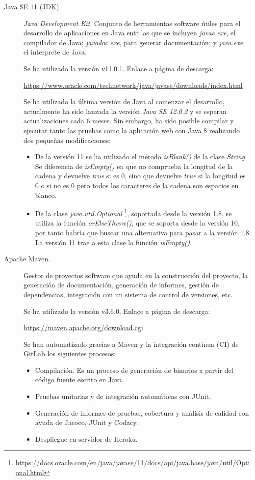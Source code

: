 \begin{description}
	\item[Java SE 11 (JDK).] \textit{Java Development Kit}. Conjunto de herramientas software útiles para el desarrollo de aplicaciones en Java entr las que se incluyen \textit{javac.exe}, el compilador de Java; \textit{javadoc.exe}, para generar documentación; y \textit{java.exe}, el interprete de Java.
	
		Se ha utilizado la versión  v11.0.1. Enlace a página de descarga:
		
		\url{https://www.oracle.com/technetwork/java/javase/downloads/index.html}
	
		Se ha utilizado la última versión de Java al comenzar el desarrollo, actualmente ha sido lanzada la versión \textit{Java SE 12.0.2} y se esperan actualizaciones cada 6 meses. Sin embargo, ha sido posible compilar y ejecutar tanto las pruebas como la aplicación web con Java 8 realizando dos pequeñas modificaciones:
		\begin{itemize}
			\item De la versión 11 se ha utilizado el método \textit{isBlank()} de la clase \textit{String}. Se diferencia de \textit{isEmpty()} en que no comprueba la longitud de la cadena y devuelve \textit{true} si es 0, sino que devuelve \textit{true} si la longitud es 0 o si no es 0 pero todos los caracteres de la cadena son espacios en blanco.
			\item De la clase \textit{java.util.Optional} \footnote{\url{https://docs.oracle.com/en/java/javase/11/docs/api/java.base/java/util/Optional.html}}, soportada desde la versión 1.8, se utiliza la función \textit{orElseThrow()}, que se soporta desde la versión 10, por tanto habría que buscar una alternativa para pasar a la versión 1.8. La versión 11 trae a esta clase la función \textit{isEmpty()}.
		\end{itemize}
	\item[Apache Maven.] Gestor de proyectos software que ayuda en la construcción del proyecto, la generación de documentación, generación de informes, gestión de dependencias, integración con un sistema de control de versiones, etc. 
	
		Se ha utilizado la versión  v3.6.0. Enlace a página de descarga:
		
		\url{https://maven.apache.org/download.cgi}
		
		Se han automatizado gracias a Maven y la integración continua (CI) de GitLab los siguientes procesos:
		\begin{itemize}
			\item Compilación. Es un proceso de generación de binarios a partir del código fuente escrito en Java.
			\item Pruebas unitarias y de integración automáticas con JUnit.
			\item Generación de informes de pruebas, cobertura y análisis de calidad con ayuda de Jacoco, JUnit y Codacy.
			\item Despliegue en servidor de Heroku.
		\end{itemize}
	

\end{description}
